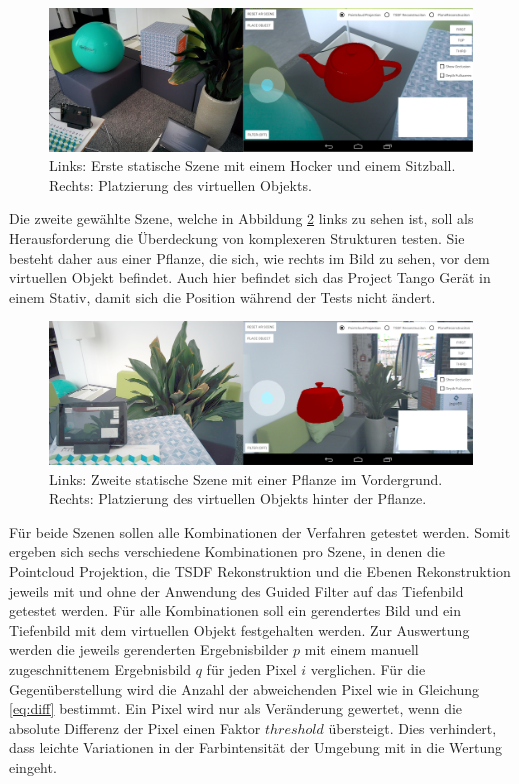 \begin{figure}[h]
  \centering
	\includegraphics[width=1.0\textwidth]{content/images/evaluation/static-scene.png} 
  \caption{Links: Erste statische Szene mit einem Hocker und einem Sitzball. Rechts: Platzierung des virtuellen Objekts. }
  \label{fig:static-scene}
\end{figure}

Die zweite gewählte Szene, welche in Abbildung \ref{fig:plant-scene} links zu sehen ist, soll als Herausforderung die Überdeckung von komplexeren Strukturen testen. Sie besteht daher aus einer Pflanze, die sich, wie rechts im Bild zu sehen, vor dem virtuellen Objekt befindet. Auch hier befindet sich das Project Tango Gerät in einem Stativ, damit sich die Position während der Tests nicht ändert. 

\begin{figure}[h]
  \centering
	\includegraphics[width=1.0\textwidth]{content/images/evaluation/plant-scene.png} 
  \caption{Links: Zweite statische Szene mit einer Pflanze im Vordergrund. Rechts: Platzierung des virtuellen Objekts hinter der Pflanze. }
  \label{fig:plant-scene}
\end{figure}

Für beide Szenen sollen alle Kombinationen der Verfahren getestet werden. Somit ergeben sich sechs verschiedene Kombinationen pro Szene, in denen die Pointcloud Projektion, die TSDF Rekonstruktion und die Ebenen Rekonstruktion jeweils mit und ohne der Anwendung des Guided Filter auf das Tiefenbild getestet werden. Für alle Kombinationen soll ein gerendertes Bild und ein Tiefenbild mit dem virtuellen Objekt festgehalten werden. Zur Auswertung werden die jeweils gerenderten Ergebnisbilder \(p\) mit einem manuell zugeschnittenem Ergebnisbild  \(q\) für jeden Pixel \(i\) verglichen. Für die Gegenüberstellung wird die Anzahl der abweichenden Pixel wie in Gleichung \ref{eq:diff} bestimmt. Ein Pixel wird nur als Veränderung gewertet, wenn die absolute Differenz der Pixel einen Faktor \(threshold\) übersteigt. Dies verhindert, dass leichte Variationen in der Farbintensität der Umgebung mit in die Wertung eingeht.

